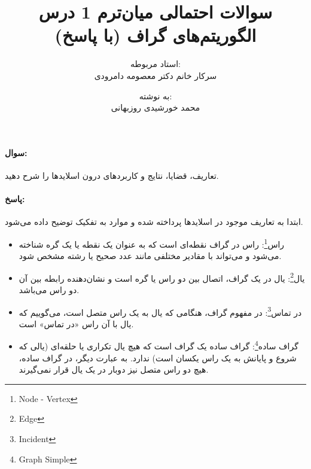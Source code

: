 \documentclass[a4paper,10pt]{article}
\title{سوالات احتمالی میان‌ترم 1 درس الگوریتم‌های گراف (با پاسخ)}
\author{استاد مربوطه:\\سرکار خانم دکتر معصومه دامرودی \and به نوشته:\\محمد خورشیدی روزبهانی}
\date{}
\begin{document}
    \maketitle

    \paragraph{سوال:} تعاریف، قضایا، نتایج و کاربردهای درون اسلایدها را شرح دهید.

    \paragraph{پاسخ:} ابتدا به تعاریف موجود در اسلایدها پرداخته شده و موارد به تفکیک توضیح داده می‌شود.

    \begin{itemize}
        
        \item راس\footnote{\hspace{2pt}Node - Vertex}: راس در گراف نقطه‌ای است که به عنوان یک نقطه یا یک گره شناخته می‌شود و می‌تواند با مقادیر مختلفی مانند عدد صحیح یا رشته مشخص شود.
        
        \item یال\footnote{\hspace{2pt}Edge}: یال در یک گراف، اتصال بین دو راس یا گره است و نشان‌دهنده رابطه بین آن دو راس می‌باشد.
        
        \item در تماس\footnote{\hspace{2pt}Incident}: در مفهوم گراف، هنگامی که یال به یک راس متصل است، می‌گوییم که یال با آن راس «در تماس» است.

        \item گراف ساده\footnote{\hspace{2pt}Graph Simple}: گراف ساده یک گراف است که هیچ یال تکراری یا حلقه‌ای (یالی که شروع و پایانش به یک راس یکسان است) ندارد. به عبارت دیگر، در گراف ساده، هیچ دو راس متصل نیز دوبار در یک یال قرار نمی‌گیرند.
        
        \begin{center}
            
\end{center}
\end{itemize}
\end{document}
